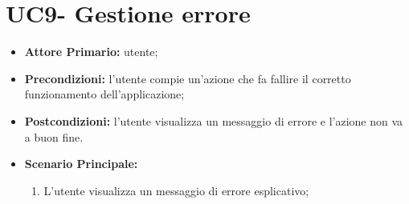 \section{UC9- Gestione errore}
\begin{itemize}
  \item \textbf{Attore Primario:} utente;
  \item \textbf{Precondizioni:} l'utente compie un'azione che fa fallire il corretto funzionamento dell'applicazione;
  \item \textbf{Postcondizioni:} l'utente visualizza un messaggio di errore e l'azione non va a buon fine.
  \item \textbf{Scenario Principale:}
  \begin{enumerate}
    \item L'utente visualizza un messaggio di errore esplicativo;
  \end{enumerate}
\end{itemize}